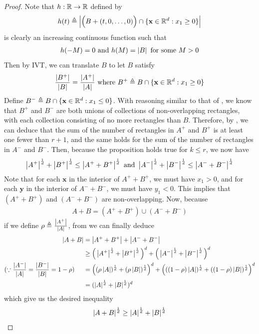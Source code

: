 \documentclass{report}
\begin{document}
\begin{proof}
Note that $h:\mathbb{R}\rightarrow \mathbb{R}$ defined by
\begin{align*}
h(t)\triangleq  \left|\Big(B+(t,0,\dots ,0) \Big)\cap \{ \textbf{x}\in\mathbb{R}^d: x_1\geq 0 \}\right|
\end{align*}
is clearly an increasing continuous function such that 
\begin{align*}
h(-M)=0\text{ and }h(M)=\left|B\right|\text{ for some }M>0
\end{align*}
Then by IVT, we can translate $B$ to let $B$ satisfy 
\begin{align}
  \label{rai}
\frac{\left|B^+\right|}{\left|B\right|}=\frac{\left|A^+\right|}{\left|A\right|} \text{ where }B^+ \triangleq B \cap \{ \textbf{x}\in\mathbb{R}^d: x_1\geq 0 \}
\end{align}
Define $B^- \triangleq B \cap \{ \textbf{x} \in \mathbb{R}^d : x_1 \leq 0 \}$. With reasoning similar to that of , we know that $B^+$ and $B^-$ are both unions of collections of non-overlapping rectangles, with each collection consisting of no more rectangles than $B$. Therefore, by , we can deduce that the sum of the number of rectangles in $A^+$ and $B^+$ is at least one fewer than $r + 1$, and the same holds for the sum of the number of rectangles in $A^-$ and $B^-$. Then, because the proposition holds true for $k \leq r$, we now have
\begin{align*}
\left|A^+\right|^{\frac{1}{d}}+ \left|B^+\right|^{\frac{1}{d}}\leq \left|A^++B^+\right|^{\frac{1}{d}}\text{ and }\left|A^-\right|^{\frac{1}{d}}+ \left|B^-\right|^{\frac{1}{d}}\leq \left|A^-+B^-\right|^{\frac{1}{d}}
\end{align*}
Note that for each $\textbf{x}$ in the interior of $A^++B^+$, we must have  $x_1>0$, and for each  $\textbf{y}$ in the interior of $A^-+B^-$, we must have $y_1<0$. This implies that  $(A^++B^+)$ and $(A^-+B^-)$ are non-overlapping. Now, because 
\begin{align*}
A+B =(A^++B^+)\cup (A^-+B^-)
\end{align*}
if we define $\rho \triangleq \frac{\left|A^+\right|}{\left|A\right|}$, from  we can finally deduce 
\begin{align*}
\left|A+B\right|&= \left|A^++B^+\right|+ \left|A^-+B^-\right|\\
&\geq \Big(\left|A^+\right|^{\frac{1}{d}} + \left|B^+\right|^{\frac{1}{d}} \Big)^{d} + \Big(\left|A^-\right|^{\frac{1}{d}}+\left|B^-\right|^{\frac{1}{d}}  \Big)^d \\ 
(\because \frac{\left|A^-\right|}{\left|A\right|}=\frac{\left|B^-\right|}{\left|B\right|}=1-\rho)\hspace{0.5cm}&=\Big((\rho \left|A\right|)^{\frac{1}{d}}+ (\rho \left|B\right|)^{\frac{1}{d}} \Big)^d + \Big(((1-\rho)\left|A\right|)^{\frac{1}{d}}+ ((1-\rho)\left|B\right|)^{\frac{1}{d}} \Big)^d \\
&=(\left|A\right|^{\frac{1}{d}}+\left|B\right|^{\frac{1}{d}})^d
\end{align*}
which give us the desired inequality  
\begin{align*}
\left|A+B\right|^{\frac{1}{d}}\geq \left|A\right|^{\frac{1}{d}}+ \left|B\right|^{\frac{1}{d}}
\end{align*}
\end{proof}
\end{document}
